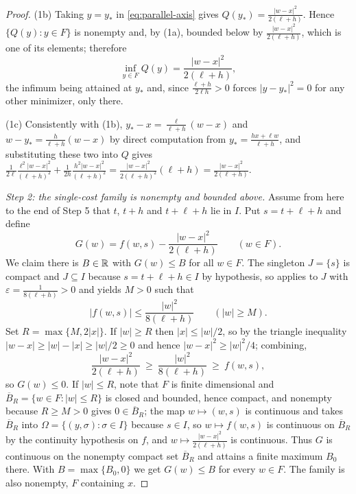 \begin{proof}
(1b) Taking $y=y_*$ in \eqref{eq:parallel-axis} gives
$Q(y_*)=\frac{|w-x|^2}{2(\ell+h)}$. Hence $\{Q(y):y\in F\}$ is nonempty and,
by (1a), bounded below by $\frac{|w-x|^2}{2(\ell+h)}$, which is one of its
elements; therefore
\[
  \inf_{y\in F}Q(y)=\frac{|w-x|^2}{2(\ell+h)} ,
\]
the infimum being attained at $y_*$ and, since $\frac{\ell+h}{2\ell h}>0$
forces $|y-y_*|^2=0$ for any other minimizer, only there.

(1c) Consistently with (1b), $y_*-x=\frac{\ell}{\ell+h}(w-x)$ and
$w-y_*=\frac{h}{\ell+h}(w-x)$ by direct computation from
$y_*=\frac{h x+\ell w}{\ell+h}$, and substituting these two into $Q$ gives
$\frac1{2\ell}\frac{\ell^2|w-x|^2}{(\ell+h)^2}
 +\frac1{2h}\frac{h^2|w-x|^2}{(\ell+h)^2}
 =\frac{|w-x|^2}{2(\ell+h)^2}(\ell+h)=\frac{|w-x|^2}{2(\ell+h)}$.

\emph{Step 2: the single-cost family is nonempty and bounded above.}
Assume from here to the end of Step 5 that $t$, $t+h$ and $t+\ell+h$ lie in
$I$. Put $s=t+\ell+h$ and define
\[
  G(w)=f(w,s)-\frac{|w-x|^2}{2(\ell+h)}\qquad(w\in F).
\]
We claim there is $B\in\mathbb{R}$ with $G(w)\le B$ for all $w\in F$. The singleton
$J=\{s\}$ is compact and $J\subseteq I$ because $s=t+\ell+h\in I$ by
hypothesis, so  applies to $J$ with
$\varepsilon=\frac1{8(\ell+h)}>0$ and yields $M>0$ such that
\[
  |f(w,s)|\le\frac{|w|^2}{8(\ell+h)}\qquad(|w|\ge M).
\]
Set $R=\max\{M,2|x|\}$. If $|w|\ge R$ then $|x|\le|w|/2$, so by the triangle
inequality $|w-x|\ge|w|-|x|\ge|w|/2\ge0$ and hence $|w-x|^2\ge|w|^2/4$;
combining,
\[
  \frac{|w-x|^2}{2(\ell+h)}\ \ge\ \frac{|w|^2}{8(\ell+h)}\ \ge\ f(w,s),
\]
so $G(w)\le0$. If $|w|\le R$, note that $F$ is finite dimensional and
$\overline B_R=\{w\in F:|w|\le R\}$ is closed and bounded, hence compact, and
nonempty because $R\ge M>0$ gives $0\in\overline B_R$; the map
$w\mapsto(w,s)$ is continuous and takes $\overline B_R$ into
$\Omega=\{(y,\sigma):\sigma\in I\}$ because $s\in I$, so $w\mapsto f(w,s)$ is
continuous on $\overline B_R$ by the continuity hypothesis on $f$, and
$w\mapsto\frac{|w-x|^2}{2(\ell+h)}$ is continuous. Thus $G$ is continuous on
the nonempty compact set $\overline B_R$ and attains a finite maximum $B_0$
there. With
$B=\max\{B_0,0\}$ we get $G(w)\le B$ for every $w\in F$. The family is also
nonempty, $F$ containing $x$.


\end{proof}
